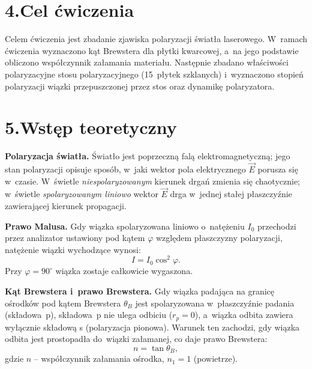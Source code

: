 \documentclass[a4paper,12pt]{article}
\title{}
\date{}
\begin{document}


\section*{4.\quad Cel ćwiczenia}

Celem ćwiczenia jest zbadanie zjawiska polaryzacji światła laserowego.
W~ramach ćwiczenia wyznaczono kąt Brewstera dla płytki kwarcowej, a~na
jego podstawie obliczono współczynnik załamania materiału. Następnie
zbadano właściwości polaryzacyjne stosu polaryzacyjnego (15~płytek szklanych)
i~wyznaczono stopień polaryzacji wiązki przepuszczonej przez stos oraz
dynamikę polaryzatora.

\section*{5.\quad Wstęp teoretyczny}

\textbf{Polaryzacja światła.}
Światło jest poprzeczną falą elektromagnetyczną; jego stan polaryzacji opisuje
sposób, w~jaki wektor pola elektrycznego $\vec{E}$ porusza się w~czasie.
W~świetle \emph{niespolaryzowanym} kierunek drgań zmienia się chaotycznie;
w~świetle \emph{spolaryzowanym liniowo} wektor $\vec{E}$ drga w~jednej
stałej płaszczyźnie zawierającej kierunek propagacji.

\medskip
\textbf{Prawo Malusa.}
Gdy wiązka spolaryzowana liniowo o~natężeniu $I_0$ przechodzi przez analizator
ustawiony pod kątem $\varphi$ względem płaszczyzny polaryzacji, natężenie
wiązki wychodzące wynosi:
\begin{equation}
  I = I_0 \cos^2\!\varphi .
  \label{eq:malus}
\end{equation}
Przy \(\varphi = 90^\circ\) wiązka zostaje całkowicie wygaszona.

\medskip
\textbf{Kąt Brewstera i~prawo Brewstera.}
Gdy wiązka padająca na granicę ośrodków pod kątem Brewstera $\theta_B$ jest
spolaryzowana w~płaszczyźnie padania (składowa~p), składowa~p nie ulega
odbiciu ($r_p = 0$), a~wiązka odbita zawiera wyłącznie składową s
(polaryzacja pionowa). Warunek ten zachodzi, gdy wiązka odbita jest
prostopadła do~wiązki załamanej, co daje prawo Brewstera:
\begin{equation}
  n = \tan\theta_B ,
  \label{eq:brewster}
\end{equation}
gdzie $n$ -- współczynnik załamania ośrodka, $n_1 = 1$ (powietrze).
\end{document}
